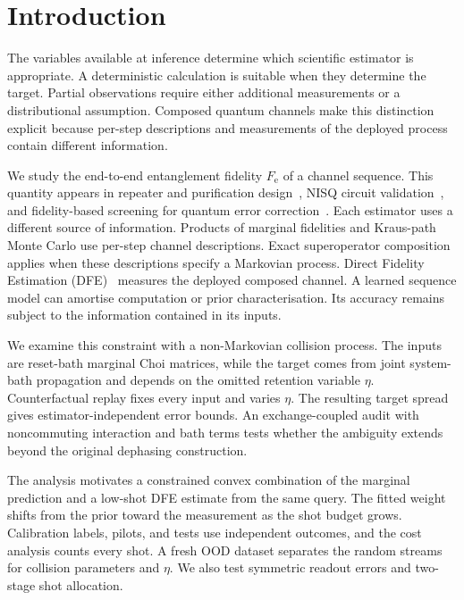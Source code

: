 \documentclass[12pt]{iopart}
\newcommand{\Fe}{F_{\mathrm{e}}}
\begin{document}
\section{Introduction}
\label{sec:intro}

The variables available at inference determine which scientific estimator is appropriate. A deterministic calculation is suitable when they determine the target. Partial observations require either additional measurements or a distributional assumption. Composed quantum channels make this distinction explicit because per-step descriptions and measurements of the deployed process contain different information.

We study the end-to-end entanglement fidelity $\Fe$ of a channel sequence. This quantity appears in repeater and purification design~\cite{repeater_review,dur2007entanglement}, NISQ circuit validation~\cite{nisq_validation}, and fidelity-based screening for quantum error correction~\cite{qec_review}. Each estimator uses a different source of information. Products of marginal fidelities and Kraus-path Monte Carlo use per-step channel descriptions. Exact superoperator composition applies when these descriptions specify a Markovian process. Direct Fidelity Estimation (DFE)~\cite{flammia_liu_2011} measures the deployed composed channel. A learned sequence model can amortise computation or prior characterisation. Its accuracy remains subject to the information contained in its inputs.

We examine this constraint with a non-Markovian collision process. The inputs are reset-bath marginal Choi matrices, while the target comes from joint system-bath propagation and depends on the omitted retention variable $\eta$. Counterfactual replay fixes every input and varies $\eta$. The resulting target spread gives estimator-independent error bounds. An exchange-coupled audit with noncommuting interaction and bath terms tests whether the ambiguity extends beyond the original dephasing construction.

The analysis motivates a constrained convex combination of the marginal prediction and a low-shot DFE estimate from the same query. The fitted weight shifts from the prior toward the measurement as the shot budget grows. Calibration labels, pilots, and tests use independent outcomes, and the cost analysis counts every shot. A fresh OOD dataset separates the random streams for collision parameters and $\eta$. We also test symmetric readout errors and two-stage shot allocation.
\end{document}

